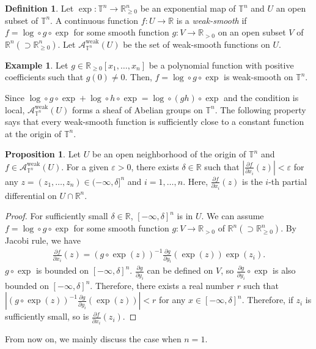 \documentclass[a4paper,dvipdfmx,reqno,12pt]{amsart}
\theoremstyle{definition}
\newtheorem{definition}[theorem]{Definition}
\newtheorem{example}[theorem]{Example}
\newtheorem{proposition}[theorem]{Proposition}
\newcommand{\vep}{\varepsilon}%
\newcommand{\opn}[1]{\operatorname{#1}}
\numberwithin{equation}{section}
\begin{document}
\begin{definition} \label{definition-weak-smooth}
Let $\opn{exp}\colon \mathbb{T}^{n}\to 
\mathbb{R}_{\geq 0}^{n}$ be an exponential map of 
$\mathbb{T}^{n}$ and $U$ an open subset of 
$\mathbb{T}^{n}$.
A continuous function $f\colon U\to \mathbb{R}$
is a \emph{weak-smooth} if 
$f=\opn{log}\circ g\circ \opn{exp}$ for some 
smooth function $g\colon V\to \mathbb{R}_{>0}$ on 
an open subset $V$ of $\mathbb{R}^{n} 
(\supset \mathbb{R}_{\geq 0}^{n})$.
Let $\mathcal{A}_{\mathbb{T}^{n}}^{\mathrm{weak}}(U)$ 
be the set of weak-smooth functions on $U$.
\end{definition}

\begin{example}
Let 
$g\in \mathbb{R}_{\geq 0}[x_1,\ldots,x_n]$ be a polynomial 
function with positive coefficients such that $g(0)\ne 0$. 
Then, $f=\opn{log}\circ g \circ \opn{exp}$ is weak-smooth 
on $\mathbb{T}^{n}$.
\end{example}

Since $\opn{log}\circ g\circ\opn{exp}+\opn{log}\circ h
\circ \opn{exp}=\opn{log}\circ(gh)\circ\opn{exp}$ and 
the condition is local, 
$\mathcal{A}_{\mathbb{T}^{n}}^{\opn{weak}}(U)$ forms a 
sheaf of Abelian groups on $\mathbb{T}^{n}$. 
The following property says that every weak-smooth 
function is sufficiently close to a constant function 
at the origin of $\mathbb{T}^{n}$.
\begin{proposition}
Let $U$ be an open neighborhood of the origin of 
$\mathbb{T}^{n}$ and 
 $f\in \mathcal{A}_{\mathbb{T}^{n}}^{\mathrm{weak}}(U)$.
For a given $\vep >0$, there exists $\delta\in \mathbb{R}$
such that $|\frac{\partial f}{\partial x_i}(z)|<\vep$
for any $z=(z_1,\ldots,z_n) \in (-\infty,\delta]^{n}$ and $i=1,\ldots,n$. 
Here, $\frac{\partial f}{\partial x_i}(z)$ is the $i$-th partial 
differential on $U\cap \mathbb{R}^{n}$.
\end{proposition}
\begin{proof}
For sufficiently small $\delta\in \mathbb{R}$, 
$[-\infty,\delta]^{n}$ is in $U$. 
We can assume $f=\opn{log}\circ g\circ \opn{exp}$ for
some smooth function 
$g\colon V\to \mathbb{R}_{>0}$ of $\mathbb{R}^{n} 
(\supset \mathbb{R}_{\geq 0}^{n})$.
By Jacobi rule, we have
\begin{align}
\frac{\partial f}{\partial x_i}(z)=(g\circ \opn{exp}(z))^{-1} 
\frac{\partial g}{\partial y_i}(\opn{exp}(z))\opn{exp}(z_i).
\end{align}
$g\circ \opn{exp}$ is bounded on $[-\infty,\delta]^{n}$.
$\frac{\partial g}{\partial y_i}$ can be defined 
on $V$, so $\frac{\partial g}{\partial y_i}\circ \opn{exp}$
is also bounded on $[-\infty,\delta]^{n}$.
Therefore, there exists a real number $r$ such that
$|(g\circ \opn{exp}(z))^{-1} 
\frac{\partial g}{\partial y_i}(\opn{exp}(z))|<r$ for any 
$x\in [-\infty,\delta]^{n}$.
Therefore, if $z_i$ is sufficiently small, so is 
$\frac{\partial f}{\partial x_i}(z_i)$. 
\end{proof}
From now on, we mainly discuss the case when $n=1$.
\end{document}
